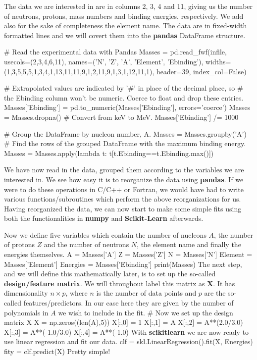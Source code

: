 \documentclass[%
oneside,                 %
final,                   %
10pt]{article}
\begin{document}
The data we are interested in are in columns 2, 3, 4 and 11, giving us
the number of neutrons, protons, mass numbers and binding energies,
respectively. We add also for the sake of completeness the element name. The data are in fixed-width formatted lines and we will
covert them into the \textbf{pandas} DataFrame structure.

\bpycod
# Read the experimental data with Pandas
Masses = pd.read_fwf(infile, usecols=(2,3,4,6,11),
              names=('N', 'Z', 'A', 'Element', 'Ebinding'),
              widths=(1,3,5,5,5,1,3,4,1,13,11,11,9,1,2,11,9,1,3,1,12,11,1),
              header=39,
              index_col=False)

# Extrapolated values are indicated by '#' in place of the decimal place, so
# the Ebinding column won't be numeric. Coerce to float and drop these entries.
Masses['Ebinding'] = pd.to_numeric(Masses['Ebinding'], errors='coerce')
Masses = Masses.dropna()
# Convert from keV to MeV.
Masses['Ebinding'] /= 1000

# Group the DataFrame by nucleon number, A.
Masses = Masses.groupby('A')
# Find the rows of the grouped DataFrame with the maximum binding energy.
Masses = Masses.apply(lambda t: t[t.Ebinding==t.Ebinding.max()])
\epycod

We have now read in the data, grouped them according to the variables we are interested in. 
We see how easy it is to reorganize the data using \textbf{pandas}. If we
were to do these operations in C/C++ or Fortran, we would have had to
write various functions/subroutines which perform the above
reorganizations for us.  Having reorganized the data, we can now start
to make some simple fits using both the functionalities in \textbf{numpy} and
\textbf{Scikit-Learn} afterwards. 

Now we define five variables which contain
the number of nucleons $A$, the number of protons $Z$ and the number of neutrons $N$, the element name and finally the energies themselves.
\bpycod
A = Masses['A']
Z = Masses['Z']
N = Masses['N']
Element = Masses['Element']
Energies = Masses['Ebinding']
print(Masses)
\epycod
The next step, and we will define this mathematically later, is to set up the so-called \textbf{design/feature matrix}. We will throughout label  this matrix as $\bm{X}$.
It has dimensionality $n\times p$, where $n$ is the number of data points and $p$ are the so-called features/predictors. In our case here they are given by the number of polynomials in $A$ we wish to include in the fit. 
\bpycod
# Now we set up the design matrix X
X = np.zeros((len(A),5))
X[:,0] = 1
X[:,1] = A
X[:,2] = A**(2.0/3.0)
X[:,3] = A**(-1.0/3.0)
X[:,4] = A**(-1.0)
\epycod
With \textbf{scikitlearn} we are now ready to use linear regression and fit our data.
\bpycod
clf = skl.LinearRegression().fit(X, Energies)
fity = clf.predict(X)
\epycod
Pretty simple!  
\end{document}
